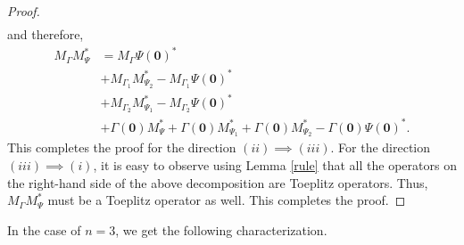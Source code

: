\documentclass[12pt]{amsart}
\theoremstyle{definition}
\newcommand{\1}{{\mbox{\bf 1}}}
\begin{document}
\begin{proof}
\begin{align*}
\end{align*}
and therefore,
\begin{align*}
M_{\Gamma}M_{\Psi}^*  &=  M_{\Gamma} \Psi(\bm{0})^*\\
&+M_{\Gamma_1} M_{\Psi_2}^* - M_{\Gamma_1} \Psi(\bm{0})^*\\
&+M_{\Gamma_2} M_{\Psi_1}^*  - M_{\Gamma_2} \Psi(\bm{0})^* \\
& + \Gamma(\bm{0}) M_{\Psi}^* + \Gamma(\bm{0}) M_{\Psi_1}^* + \Gamma(\bm{0}) M_{\Psi_2}^*- \Gamma(\bm{0}) \Psi(\bm{0})^*.
\end{align*}
This completes the proof for the direction $(ii) \implies (iii)$. For the direction $(iii) \implies (i)$, it is easy to observe using Lemma \ref{rule} that all the operators on the right-hand side of the above decomposition are Toeplitz operators. Thus, $M_{\Gamma}M_{\Psi}^*$ must be a Toeplitz operator as well. This completes the proof.
\end{proof}

In the case of $n=3$, we get the following characterization.
\end{document}
